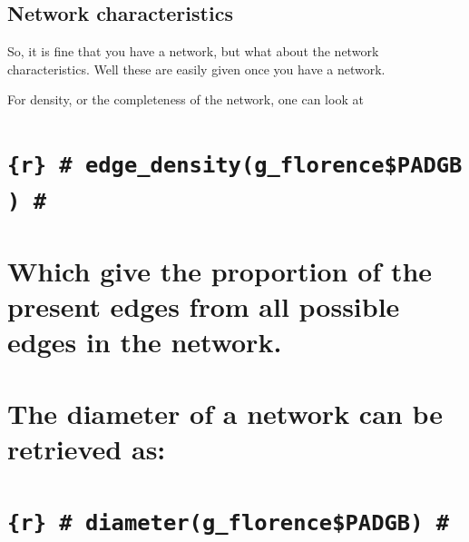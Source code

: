 \documentclass[]{article}
\theoremstyle{definition}
\theoremstyle{definition}
\theoremstyle{definition}
\theoremstyle{remark}
\begin{document}
\hypertarget{htmlwidget-e9b1f17896017ee427e8}{}

\subsection{Network characteristics}\label{network-characteristics}

So, it is fine that you have a network, but what about the network
characteristics. Well these are easily given once you have a network.

For density, or the completeness of the network, one can look at

\section{\texorpdfstring{\texttt{\{r\}\ \#\ edge\_density(g\_florence\$PADGB)\ \#}}{\{r\} \# edge\_density(g\_florence\$PADGB) \#}}\label{r-edge_densityg_florencepadgb}

\section{}\label{section}

\section{Which give the proportion of the present edges from all
possible edges in the
network.}\label{which-give-the-proportion-of-the-present-edges-from-all-possible-edges-in-the-network.}

\section{}\label{section-1}

\section{The diameter of a network can be retrieved
as:}\label{the-diameter-of-a-network-can-be-retrieved-as}

\section{}\label{section-2}

\section{\texorpdfstring{\texttt{\{r\}\ \#\ diameter(g\_florence\$PADGB)\ \#}}{\{r\} \# diameter(g\_florence\$PADGB) \#}}\label{r-diameterg_florencepadgb}
\end{document}
